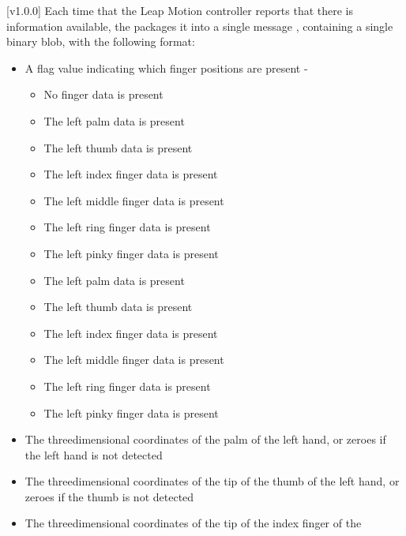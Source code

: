 [v1.0.0]
Each time that the Leap Motion controller reports that there is information available,
the  packages it into a single message
\openSq{}\closeSq, containing a single binary blob, with the following
format:
\begin{itemize}
\item A flag value indicating which finger positions are present -
\begin{itemize}
\item {} No finger data is present
\item\exSp{} The left palm data is present
\item\exSp{} The left thumb data is present
\item\exSp{} The left index finger data is present
\item\exSp{} The left middle finger data is present
\item\exSp{} The left ring finger data is present
\item\exSp{} The left pinky finger data is present
\item\exSp{} The left palm data is present
\item\exSp{} The left thumb data is present
\item\exSp{} The left index finger data is present
\item\exSp{} The left middle finger data is present
\item\exSp{} The left ring finger data is present
\item\exSp{} The left pinky finger data is present
\end{itemize}
\item\exSp{}The three\longDash{}dimensional coordinates of the palm of the left hand, or
zeroes if the left hand is not detected
\item\exSp{}The three\longDash{}dimensional coordinates of the tip of the thumb of the
left hand, or zeroes if the thumb is not detected
\item\exSp{}The three\longDash{}dimensional coordinates of the tip of the index finger of the

\end{itemize}
